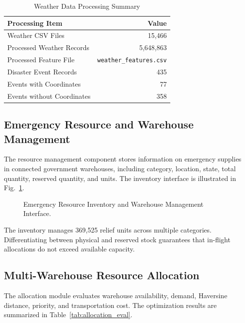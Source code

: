 \documentclass[conference]{IEEEtran}
\begin{document}
\begin{table}[htbp]
\centering
\caption{Weather Data Processing Summary}
\label{tab:weather_summary}
\begin{tabular}{lr}
\toprule
\textbf{Processing Item} & \textbf{Value} \\
\midrule
Weather CSV Files & 15,466 \\
Processed Weather Records & 5,648,863 \\
Processed Feature File & \texttt{weather\_features.csv} \\
Disaster Event Records & 435 \\
Events with Coordinates & 77 \\
Events without Coordinates & 358 \\
\bottomrule
\end{tabular}
\end{table}

\subsection{Emergency Resource and Warehouse Management}
The resource management component stores information on emergency supplies in connected government warehouses, including category, location, state, total quantity, reserved quantity, and units. The inventory interface is illustrated in Fig.~\ref{fig:inventory}.

\begin{figure}[htbp]
\centering
\fbox{\rule{0pt}{1.8in} \rule{0.9\linewidth}{0pt}}
\caption{Emergency Resource Inventory and Warehouse Management Interface.}
\label{fig:inventory}
\end{figure}

The inventory manages 369,525 relief units across multiple categories. Differentiating between physical and reserved stock guarantees that in-flight allocations do not exceed available capacity.

\subsection{Multi-Warehouse Resource Allocation}
The allocation module evaluates warehouse availability, demand, Haversine distance, priority, and transportation cost. The optimization results are summarized in Table~\ref{tab:allocation_eval}.
\end{document}
